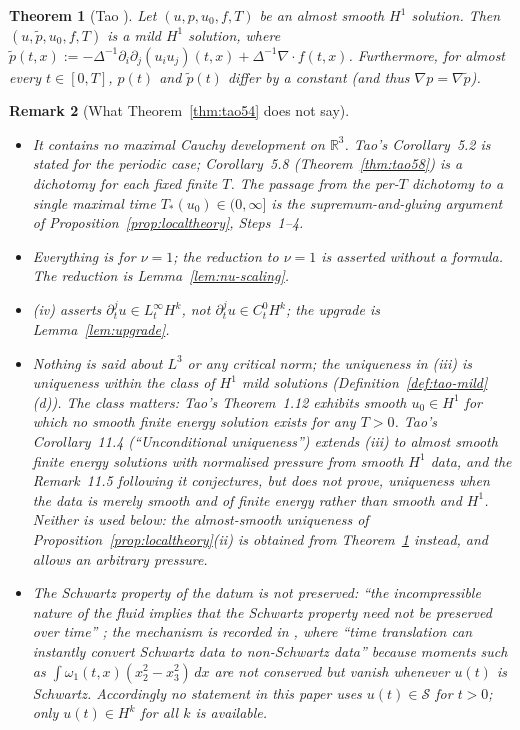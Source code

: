 \documentclass[11pt]{article}
\newtheorem{theorem}{Theorem}[section]
\newtheorem{remark}[theorem]{Remark}
\theoremstyle{definition}
\theoremstyle{plain}
\newcommand{\R}{\mathbb R}
\begin{document}
\begin{theorem}[Tao {\cite[Corollary~4.3, p.~47]{Tao2013}}]\label{thm:tao43}
Let $(u,p,u_0,f,T)$ be an almost smooth $H^1$ solution.  Then
$(u,\tilde p,u_0,f,T)$ is a mild $H^1$ solution, where
$\tilde p(t,x):=-\Delta^{-1}\partial_i\partial_j(u_iu_j)(t,x)
+\Delta^{-1}\nabla\cdot f(t,x)$.  Furthermore, for almost every
$t\in[0,T]$, $p(t)$ and $\tilde p(t)$ differ by a constant (and thus
$\nabla p=\nabla\tilde p$).
\end{theorem}

\begin{remark}[What Theorem~\ref{thm:tao54} does not say]\label{rem:tao-scope}
\begin{itemize}
\item[(a)] It contains no maximal Cauchy development on $\R^3$.  Tao's
Corollary~5.2 is stated for the periodic case; Corollary~5.8
(Theorem~\ref{thm:tao58}) is a dichotomy for each fixed finite $T$.  The
passage from the per-$T$ dichotomy to a single maximal time
$T_*(u_0)\in(0,\infty]$ is the supremum-and-gluing argument of
Proposition~\ref{prop:localtheory}, Steps~1--4.
\item[(b)] Everything is for $\nu=1$; the reduction to $\nu=1$ is asserted
without a formula.  The reduction is Lemma~\ref{lem:nu-scaling}.
\item[(c)] (iv) asserts $\partial_t^ju\in L^\infty_tH^k$, not
$\partial_t^ju\in C^0_tH^k$; the upgrade is Lemma~\ref{lem:upgrade}.
\item[(d)] Nothing is said about $L^3$ or any critical norm; the uniqueness
in (iii) is uniqueness \emph{within the class of $H^1$ mild solutions}
(Definition~\ref{def:tao-mild}(d)).  The class matters: Tao's Theorem~1.12
\cite[p.~30]{Tao2013} exhibits smooth $u_0\in H^1$ for which no smooth
finite energy solution exists for any $T>0$.  Tao's Corollary~11.4
(``Unconditional uniqueness'') \cite[p.~84]{Tao2013} extends (iii) to
almost smooth finite energy solutions with normalised pressure from smooth
$H^1$ data, and the Remark~11.5 following it \cite[p.~84]{Tao2013}
conjectures, but does not prove, uniqueness when the data is merely smooth
and of finite energy rather than smooth and $H^1$.  Neither is used below:
the almost-smooth uniqueness of Proposition~\ref{prop:localtheory}(ii) is
obtained from Theorem~\ref{thm:tao43} instead, and allows an arbitrary
pressure.
\item[(e)] The Schwartz property of the datum is not preserved:
``the incompressible nature of the fluid implies that the Schwartz
property need not be preserved over time'' \cite[p.~30]{Tao2013}; the
mechanism is recorded in \cite[\S3, footnote~12, p.~42]{Tao2013}, where
``time translation can instantly convert Schwartz data to non-Schwartz
data'' because moments such as $\int\omega_1(t,x)(x_2^2-x_3^2)\,dx$ are
not conserved but vanish whenever $u(t)$ is Schwartz.  Accordingly no
statement in this paper uses $u(t)\in\mathcal S$ for $t>0$; only
$u(t)\in H^k$ for all $k$ is available.
\end{itemize}
\end{remark}
\end{document}
